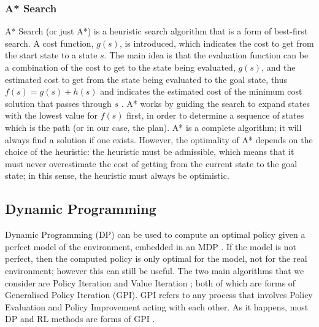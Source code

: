 \subsubsection{A* Search}
\label{sec:astar}
A* Search (or just A*) \cite{4082128} is a heuristic search algorithm that is a form of best-first search. A cost function, $g(s)$, is introduced, which indicates the cost to get from the start state to a state $s$. The main idea is that the evaluation function can be a combination of the cost to get to the state being evaluated, $g(s)$, and the estimated cost to get from the state being evaluated to the goal state, thus $f(s) = g(s) + h(s)$ and indicates the estimated cost of the minimum cost solution that passes through $s$ \cite{DBLP:books/aw/RN2020}. A* works by guiding the search to expand states with the lowest value for $f(s)$ first, in order to determine a sequence of states which is the path (or in our case, the plan). A* is a complete algorithm; it will always find a solution if one exists. However, the optimality of A* depends on the choice of the heuristic: the heuristic must be admissible, which means that it must never overestimate the cost of getting from the current state to the goal state; in this sense, the heuristic must always be optimistic.
\subsection{Dynamic Programming}
Dynamic Programming (DP) \cite{Bellman:1957, DBLP:books/lib/Bertsekas05} can be used to compute an optimal policy given a perfect model of the environment, embedded in an MDP \cite{Sutton1998}. If the model is not perfect, then the computed policy is only optimal for the model, not for the real environment; however this can still be useful. The two main algorithms that we consider are Policy Iteration \cite{Bellman:1957, howard:dp} and Value Iteration \cite{Bellman:1957}; both of which are forms of Generalised Policy Iteration (GPI). GPI refers to any process that involves Policy Evaluation and Policy Improvement acting with each other. As it happens, most DP and RL methods are forms of GPI \cite{Sutton1998}.
